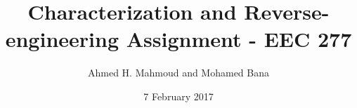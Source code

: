 \documentclass[12pt] {article}
\begin{document}
\title{Characterization and Reverse-engineering Assignment - EEC 277}
\author{Ahmed H. Mahmoud and Mohamed Bana}
\date{7 February 2017} 
\maketitle









\end{document}
